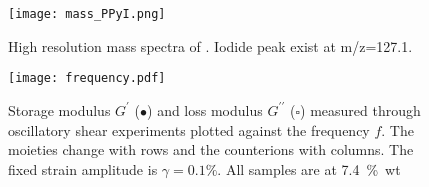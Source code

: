\documentclass[journal=jacsat,manuscript=article]{achemso}
\begin{document}
\begin{figure}
\texttt{[image: mass\_PPyI.png]}
\caption{High resolution mass spectra of . Iodide peak exist at m/z=127.1.}
\label{fig:massPPyI}
\end{figure}

\begin{figure}
\texttt{[image: frequency.pdf]}
\caption{Storage modulus $G^\prime$ ($\bullet$) and loss modulus $G^{\prime\prime}$ ($\square$) measured through oscillatory shear experiments plotted against the frequency $f$. The moieties change with rows and the counterions with columns. The fixed strain amplitude is $\gamma=0.1\%$. All samples are at 7.4~\%~wt }
\label{fig:frequency}
\end{figure}
\end{document}
